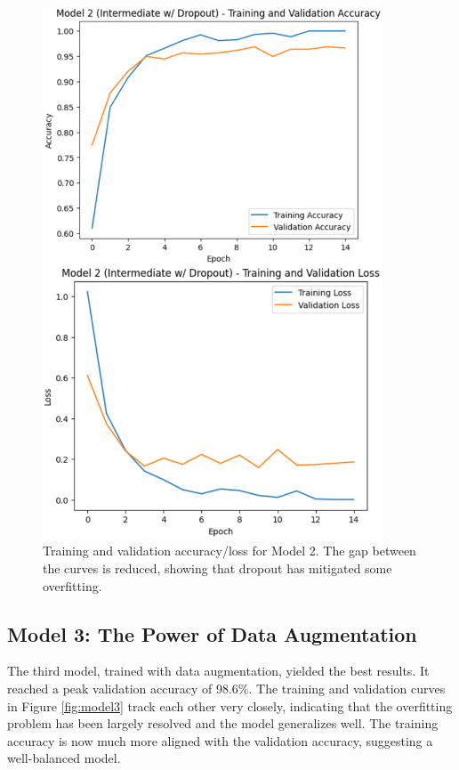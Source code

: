 \documentclass[pdflatex,sn-mathphys-num]{sn-jnl}%
\theoremstyle{thmstyleone}%
\theoremstyle{thmstyletwo}%
\theoremstyle{thmstylethree}%
\begin{document}
\begin{figure}[h]
\centering
\includegraphics[width=0.9\textwidth]{model2_curves.png}
\caption{Training and validation accuracy/loss for Model 2. The gap between the curves is reduced, showing that dropout has mitigated some overfitting.}\label{fig:model2}
\end{figure}

\subsection{Model 3: The Power of Data Augmentation}
The third model, trained with data augmentation, yielded the best results. It reached a peak validation accuracy of 98.6\%. The training and validation curves in Figure \ref{fig:model3} track each other very closely, indicating that the overfitting problem has been largely resolved and the model generalizes well. The training accuracy is now much more aligned with the validation accuracy, suggesting a well-balanced model.
\end{document}
